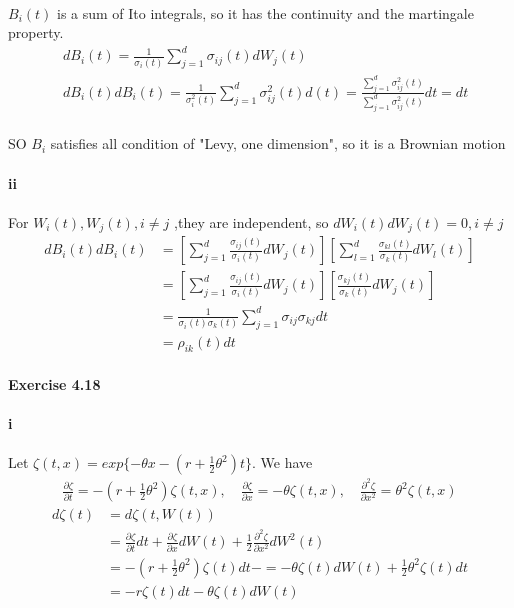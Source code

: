 \documentclass{article}
\begin{document}
\paragraph{}{$B_i(t)$ is a sum of Ito integrals, so it has the continuity and the martingale property.}
\begin{align*}
  &dB_i(t)  =\frac{1}{\sigma_i(t)}\sum_{j=1}^{d}\sigma_{ij}(t)dW_j(t)\\
  &dB_i(t)dB_i(t)=\frac{1}{\sigma_{i}^2(t)}\sum_{j=1}^{d}\sigma_{ij}^2(t)d(t)=\frac{\sum_{j=1}^{d}\sigma_{ij}^2(t)}{\sum_{j=1}^{d}\sigma_{ij}^2(t)}dt=dt
\end{align*}
\paragraph{}{SO $B_i$ satisfies all condition of "Levy, one dimension", so it is a Brownian motion }
\paragraph{ii}
\paragraph{}{For $W_i(t),W_j(t),i\neq j$ ,they are independent, so $dW_i(t)dW_j(t)=0,i\neq j$}
\begin{align*}
  dB_i(t)dB_i(t) & =[\sum_{j=1}^{d}\frac{\sigma_{ij}(t)}{\sigma_i(t)}dW_j(t)][\sum_{l=1}^{d}\frac{\sigma_{kl}(t)}{\sigma_k(t)}dW_l(t)]\\
&=[\sum_{j=1}^{d}\frac{\sigma_{ij}(t)}{\sigma_i(t)}dW_j(t)][\frac{\sigma_{kj}(t)}{\sigma_k(t)}dW_j(t)]\\
&=\frac{1}{\sigma_i(t)\sigma_k(t)}\sum_{j=1}^{d}\sigma_{ij}\sigma_{kj}dt\\
&=\rho_{ik}(t)dt
\end{align*}
\paragraph{Exercise 4.18}
\paragraph{i}
\paragraph{}{Let $\zeta(t,x)=exp\{-\theta x-(r+\frac{1}{2}\theta^2)t\}$. We have}
\begin{align*}
  \frac{\partial \zeta}{\partial t}=-(r+\frac{1}{2}\theta^2)\zeta(t,x), \quad \frac{\partial \zeta}{\partial x}=-\theta\zeta(t,x),\quad \frac{\partial^2 \zeta}{\partial x^2}=\theta^2\zeta(t,x)
\end{align*}
\begin{align*}
  d\zeta(t) &=d \zeta(t,W(t))\\
  & =\frac{\partial \zeta}{\partial t}dt+\frac{\partial \zeta}{\partial x}dW(t)+\frac{1}{2}\frac{\partial^2 \zeta}{\partial x^2}dW^2(t) \\
&=-(r+\frac{1}{2}\theta^2)\zeta(t)dt-=-\theta\zeta(t)dW(t)+\frac{1}{2}\theta^2\zeta(t)dt\\
&=-r\zeta(t)dt-\theta\zeta(t)dW(t)
\end{align*}
\end{document}
